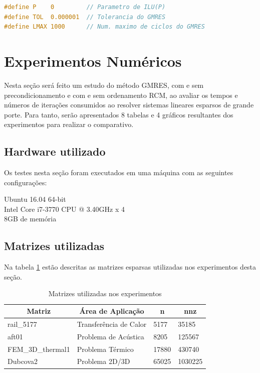 \documentclass[
	11pt,				%
	oneside,			%
	a4paper,			%
	english,			%
	brazil,				%
	]{article}
\begin{document}
\begin{lstlisting}[language=C, caption=Definições de constantes]
#define P    0         // Parametro de ILU(P)
#define TOL  0.000001  // Tolerancia do GMRES
#define LMAX 1000      // Num. maximo de ciclos do GMRES
\end{lstlisting}

\section{Experimentos Numéricos} \label{sec:expnum}
Nesta seção será feito um estudo do método GMRES, com e sem precondicionamento e com e sem ordenamento RCM, ao avaliar os tempos e números de iterações consumidos ao resolver sistemas lineares esparsos de grande porte. Para tanto, serão apresentados 8 tabelas e 4 gráficos resultantes dos experimentos para realizar o comparativo.

\subsection{Hardware utilizado}
Os testes nesta seção foram executados em uma máquina com as seguintes configurações:

Ubuntu 16.04 64-bit \\
\indent Intel Core i7-3770 CPU @ 3.40GHz x 4 \\
\indent 8GB de memória

\subsection{Matrizes utilizadas}
Na tabela \ref{tab:matrizes} estão descritas as matrizes esparsas utilizadas nos experimentos desta seção.

\begin{table}[H]
\centering
\begin{tabular}{|l|l|l|l|}
\hline
\multicolumn{1}{|c|}{\textbf{Matriz}} & \multicolumn{1}{c|}{\textbf{Área de Aplicação}} & \multicolumn{1}{c|}{\textbf{n}} & \multicolumn{1}{c|}{\textbf{nnz}} \\
\hline
rail\_5177 & Transferência de Calor & 5177 & 35185 \\
\hline
aft01 & Problema de Acústica & 8205 & 125567 \\
\hline
FEM\_3D\_thermal1 & Problema Térmico & 17880 & 430740 \\
\hline
Dubcova2 & Problema 2D/3D & 65025 & 1030225 \\
\hline
\end{tabular}
\caption{Matrizes utilizadas nos experimentos}
\label{tab:matrizes}
\end{table}
\end{document}
